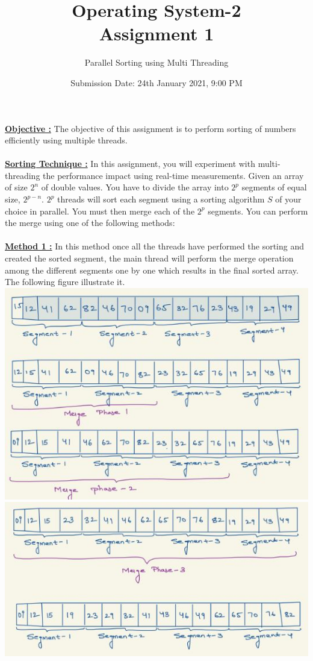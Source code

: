 \documentclass{article}
\title{Operating System-2 \\  Assignment 1}
\author{Parallel Sorting using Multi Threading }
\date{Submission Date: 24th January 2021, 9:00 PM }
\begin{document}
\maketitle
\noindent\textbf{\underline {Objective :}} The objective of this assignment is to perform sorting of numbers efficiently using multiple threads. 
\\\\ 

\noindent\textbf{\underline {Sorting Technique :}} In this assignment, you will experiment with multi-threading the performance impact using real-time measurements. Given an array of size $2^n$ of double values. You have to divide the array into $2^p$ segments of equal size, $2^{p-n}$. $2^p$ threads will sort each segment using a sorting algorithm $S$ of your choice in parallel. You must then merge each of the $2^p$ segments. You can perform the merge using one of the following methods: \\\\

\noindent\textbf{\underline {Method 1 :}} In this method once all the threads have performed the sorting and created the sorted segment, the main thread will perform the merge operation among the different segments one by one which results in the final sorted array. The following figure illustrate it. \\
\includegraphics[width=\textwidth]{IMG1.JPG}
\includegraphics[width=\textwidth]{img2.JPG}
\\\\ 
\end{document}
